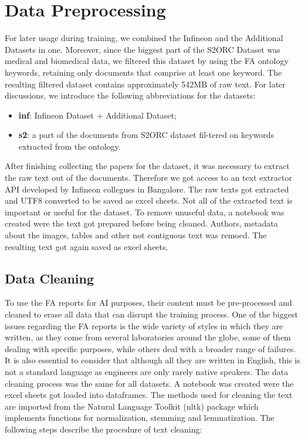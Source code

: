 \section{Data Preprocessing}
For later usage during training, we combined the Infineon and the Additional Datasets in one. Moreover, since the biggest part of the S2ORC Dataset was medical and biomedical data, we filtered this dataset by using the FA ontology keywords, retaining only documents that comprise at least one keyword. The resulting filtered dataset contains approximately 542MB of raw text. For later discussions, we introduce the following abbreviations for the datasets:

\begin{itemize}
	\item \textbf{inf}: Infineon Dataset + Additional Dataset;
	\item \textbf{s2}: a part of the documents from S2ORC dataset fil-tered on keywords extracted from the ontology.
\end{itemize}

After finishing collecting the papers for the dataset, it was necessary to extract the raw text out of the documents. Therefore we got access to an text extractor API developed by Infineon collegues in Bangalore. The raw texts got extracted and UTF8 converted to be saved as excel sheets. \newline
Not all of the extracted text is important or useful for the dataset. To remove unuseful data, a notebook was created were the text got prepared before being cleaned. Authors, metadata about the images, tables and other not contiguous text was remoed. The resulting text got again saved as excel sheets.

\subsection{Data Cleaning}
To use the FA reports for AI purposes, their content must be pre-processed and cleaned to erase all data that can disrupt the training process. One of the biggest issues regarding the FA reports is the wide variety of styles in which they are written, as they come from several laboratories around the globe, some of them dealing with specific purposes, while others deal with a broader range of failures. It is also essential to consider that although all they are written in English, this is not a standard language as engineers are only rarely native speakers. \newline
The data cleaning process was the same for all datasets. A notebook was created were the excel sheets got loaded into dataframes. The methods used for cleaning the text are imported from the \alert{Natural Language Toolkit (nltk)} package which implements functions for normalization, stemming and lemmatization.
The following steps describe the procedure of text cleaning:

